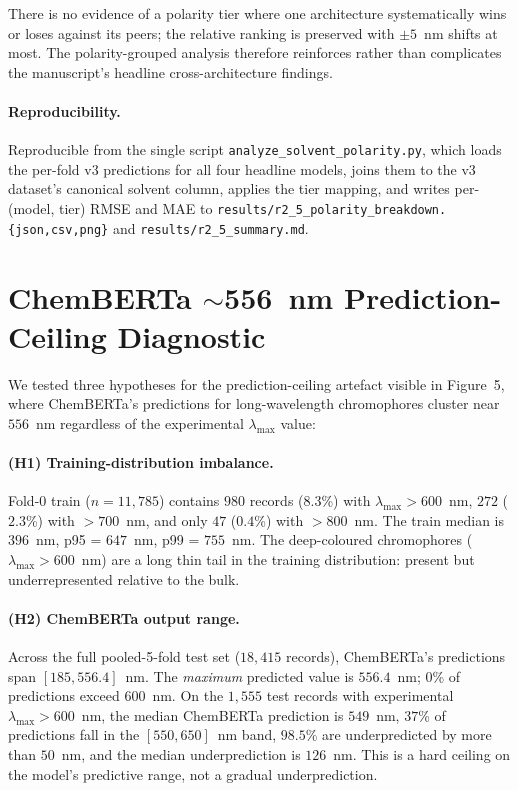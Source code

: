 \documentclass[journal=jcisd8,manuscript=suppinfo]{achemso}
\begin{document}
There is no evidence of a polarity tier where one architecture systematically wins or loses against its peers; the relative ranking is preserved with $\pm 5$~nm shifts at most. The polarity-grouped analysis therefore reinforces rather than complicates the manuscript's headline cross-architecture findings.

\paragraph{Reproducibility.}
Reproducible from the single script \texttt{analyze\_solvent\_polarity.py}, which loads the per-fold v3 predictions for all four headline models, joins them to the v3 dataset's canonical solvent column, applies the tier mapping, and writes per-(model, tier) RMSE and MAE to \texttt{results/r2\_5\_polarity\_breakdown.\{json,csv,png\}} and \texttt{results/r2\_5\_summary.md}.


\section{ChemBERTa $\sim$556~nm Prediction-Ceiling Diagnostic}
\label{si:chemberta_ceiling}

We tested three hypotheses for the prediction-ceiling artefact visible in Figure~5, where ChemBERTa's predictions for long-wavelength chromophores cluster near $556$~nm regardless of the experimental $\lambda_{\max}$ value:

\paragraph{(H1) Training-distribution imbalance.}
Fold-0 train ($n = 11{,}785$) contains $980$ records ($8.3$\%) with $\lambda_{\max} > 600$~nm, $272$ ($2.3$\%) with $> 700$~nm, and only $47$ ($0.4$\%) with $> 800$~nm. The train median is $396$~nm, p95 = $647$~nm, p99 = $755$~nm. The deep-coloured chromophores ($\lambda_{\max} > 600$~nm) are a long thin tail in the training distribution: present but underrepresented relative to the bulk.

\paragraph{(H2) ChemBERTa output range.}
Across the full pooled-5-fold test set ($18{,}415$ records), ChemBERTa's predictions span $[185, 556.4]$~nm. The \emph{maximum} predicted value is $556.4$~nm; $0$\% of predictions exceed $600$~nm. On the $1{,}555$ test records with experimental $\lambda_{\max} > 600$~nm, the median ChemBERTa prediction is $549$~nm, $37$\% of predictions fall in the $[550, 650]$~nm band, $98.5$\% are underpredicted by more than $50$~nm, and the median underprediction is $126$~nm. This is a hard ceiling on the model's predictive range, not a gradual underprediction.
\end{document}
